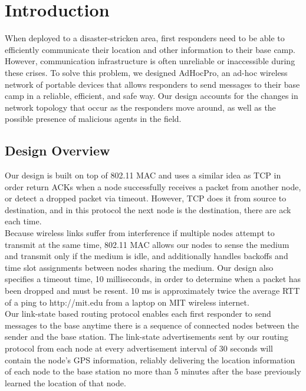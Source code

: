 \documentclass[letterpaper]{article}
\begin{document}
\section{Introduction}

When deployed to a disaster-stricken area, first responders need to be able to efficiently communicate their
location and other information to their base camp. However, communication infrastructure is often unreliable
or inaccessible during these crises. To solve this problem, we designed AdHocPro, an ad-hoc wireless network of
portable devices that allows responders to send messages to their base camp in a reliable, efficient, and safe
way. Our design accounts for the changes in network topology that occur as the responders move 
around, as well as the possible presence of malicious agents in the field. 

\subsection{Design Overview}

Our design is built on top of 802.11 MAC and uses a similar idea as TCP in order return ACKs when a node successfully receives
a packet from another node, or detect a dropped packet via timeout. However, TCP does it from source to destination, and in this protocol the next node is the destination, there are ack each time.
\\

\noindent Because wireless links suffer from interference if multiple nodes attempt to transmit at the same time,
802.11 MAC allows our nodes to sense the medium and transmit only if the medium is idle, and additionally handles
backoffs and time slot assignments between nodes sharing the medium. Our design also specifies a timeout time, 
10 milliseconds, in order to determine when a packet has been dropped and must be resent. 10 ms is approximately 
twice the average RTT of a ping to http://mit.edu from a laptop on MIT wireless internet.
\\

\noindent Our link-state based routing protocol enables each first responder to send messages to the base anytime
there is a sequence of connected nodes between the sender and the base station. The link-state advertisements 
sent by our routing protocol from each node at every advertisement interval of 30 seconds will contain the node's
GPS  information, reliably delivering the location information of each node to the base station no more than
5 minutes after the base previously learned the location of that node.
\\
\end{document}
